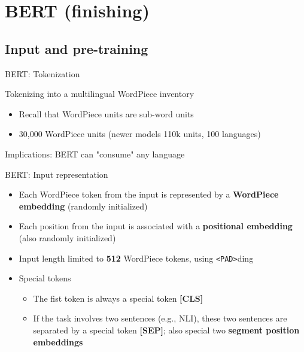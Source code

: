 \documentclass[12pt,aspectratio=169,handout]{beamer}
\begin{document}
\section{BERT (finishing)}


\subsection{Input and pre-training}

\begin{frame}{BERT: Tokenization}
	
	Tokenizing into a multilingual WordPiece inventory
	
	\begin{itemize}
		\item Recall that WordPiece units are sub-word units
		\item 30,000 WordPiece units (newer models 110k units, 100 languages)
	\end{itemize}
	
	Implications: BERT can "consume" any language
	
	
\end{frame}


\begin{frame}{BERT: Input representation}
	
	\begin{itemize}
		\item Each WordPiece token from the input is represented by a \textbf{WordPiece embedding} (randomly initialized)
		\item Each position from the input is associated with a \textbf{positional embedding} (also randomly initialized)
		\item Input length limited to \textbf{512} WordPiece tokens, using \texttt{<PAD>}ding
		\item Special tokens
		\begin{itemize}
			\item The fist token is always a special token \textbf{[CLS]}
			\item If the task involves two sentences (e.g., NLI), these two sentences are separated by a special token \textbf{[SEP]}; also special two \textbf{segment position embeddings} 
		\end{itemize}
		
	\end{itemize}
	
\end{frame}
\end{document}
